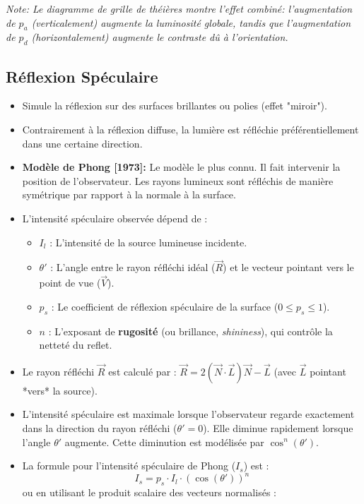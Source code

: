 \documentclass{article}
\begin{document}
\textit{Note: Le diagramme de grille de théières montre l'effet combiné: l'augmentation de $p_a$ (verticalement) augmente la luminosité globale, tandis que l'augmentation de $p_d$ (horizontalement) augmente le contraste dû à l'orientation.}

\subsection{Réflexion Spéculaire}
\begin{itemize}
    \item Simule la réflexion sur des surfaces brillantes ou polies (effet "miroir").
    \item Contrairement à la réflexion diffuse, la lumière est réfléchie préférentiellement dans une certaine direction.
    \item \textbf{Modèle de Phong [1973]:} Le modèle le plus connu. Il fait intervenir la position de l'observateur. Les rayons lumineux sont réfléchis de manière symétrique par rapport à la normale à la surface.
    \item L'intensité spéculaire observée dépend de :
        \begin{itemize}
            \item $I_l$ : L'intensité de la source lumineuse incidente.
            \item $\theta'$ : L'angle entre le rayon réfléchi idéal ($\vec{R}$) et le vecteur pointant vers le point de vue ($\vec{V}$).
            \item $p_s$ : Le coefficient de réflexion spéculaire de la surface ($0 \le p_s \le 1$).
            \item $n$ : L'exposant de \textbf{rugosité} (ou brillance, \textit{shininess}), qui contrôle la netteté du reflet.
        \end{itemize}
    \item Le rayon réfléchi $\vec{R}$ est calculé par : $\vec{R} = 2(\vec{N} \cdot \vec{L})\vec{N} - \vec{L}$ (avec $\vec{L}$ pointant *vers* la source).
    \item L'intensité spéculaire est maximale lorsque l'observateur regarde exactement dans la direction du rayon réfléchi ($\theta' = 0$). Elle diminue rapidement lorsque l'angle $\theta'$ augmente. Cette diminution est modélisée par $\cos^n(\theta')$.
    \item La formule pour l'intensité spéculaire de Phong ($I_s$) est :
      \[ I_s = p_s \cdot I_l \cdot (\cos(\theta'))^n \]
      ou en utilisant le produit scalaire des vecteurs normalisés :

\end{itemize}
\end{document}

